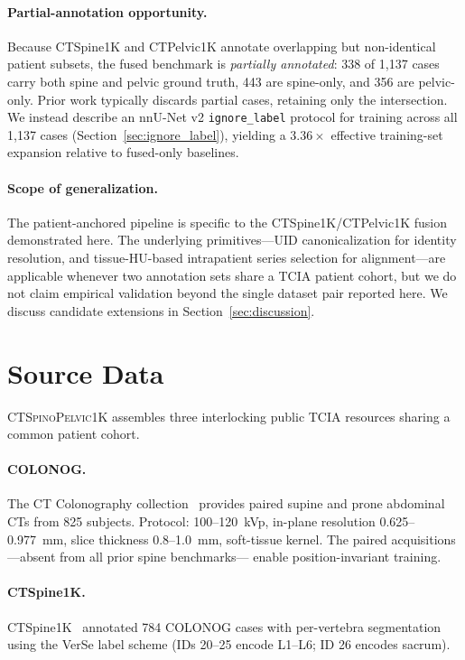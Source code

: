 \documentclass[pmlr]{jmlr}
\newcommand{\dataset}{\textsc{CTSpinoPelvic1K}}
\begin{document}
\paragraph{Partial-annotation opportunity.}
Because CTSpine1K and CTPelvic1K annotate overlapping but
non-identical patient subsets, the fused benchmark is
\emph{partially annotated}: 338 of 1{,}137 cases carry both spine
and pelvic ground truth, 443 are spine-only, and 356 are pelvic-only.
Prior work typically discards partial cases, retaining only the
intersection. We instead describe an nnU-Net v2
\texttt{ignore\_label} protocol for training across all 1{,}137
cases (Section~\ref{sec:ignore_label}), yielding a $3.36\times$
effective training-set expansion relative to fused-only baselines.

\paragraph{Scope of generalization.}
The patient-anchored pipeline is specific to the CTSpine1K/CTPelvic1K
fusion demonstrated here. The underlying primitives---UID
canonicalization for identity resolution, and tissue-HU-based
intrapatient series selection for alignment---are applicable
whenever two annotation sets share a TCIA patient cohort, but we
do not claim empirical validation beyond the single dataset pair
reported here. We discuss candidate extensions in
Section~\ref{sec:discussion}.

\section{Source Data}
\label{sec:source}

\dataset{} assembles three interlocking public TCIA resources
sharing a common patient cohort.

\paragraph{COLONOG.}
The CT Colonography collection~\citep{Smith2015DataCOLONOGRAPHY} provides
paired supine and prone abdominal CTs from 825 subjects.
Protocol: 100--120~kVp, in-plane resolution 0.625--0.977~mm, slice
thickness 0.8--1.0~mm, soft-tissue kernel.
The paired acquisitions---absent from all prior spine benchmarks---
enable position-invariant training.

\paragraph{CTSpine1K.}
CTSpine1K~\citep{Deng2021CTSpine1K:Tomography} annotated 784 COLONOG cases with
per-vertebra segmentation using the VerSe label scheme
(IDs 20--25 encode L1--L6; ID 26 encodes sacrum).
\end{document}
